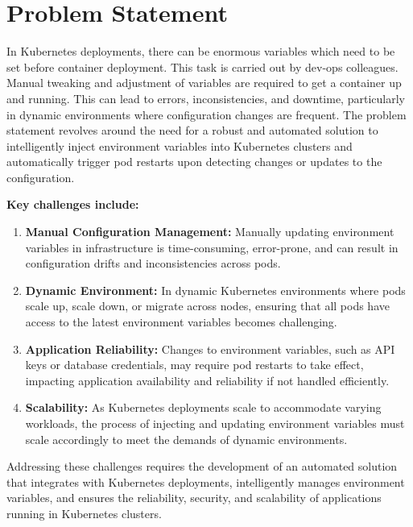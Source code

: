 \section{Problem Statement}

In Kubernetes deployments, there can be enormous variables which need to be set before container deployment. This task is carried out by dev-ops colleagues. Manual tweaking and adjustment of variables are required to get a container up and running. 
This can lead to errors, inconsistencies, and downtime, particularly in dynamic environments where configuration changes are frequent. The problem statement revolves around the need for a robust and automated solution to intelligently inject environment variables into Kubernetes clusters and automatically trigger pod restarts upon detecting changes or updates to the configuration.

\bigskip

\textbf{Key challenges include:}

\begin{enumerate}
    \item \textbf{Manual Configuration Management:} Manually updating environment variables in infrastructure is time-consuming, error-prone, and can result in configuration drifts and inconsistencies across pods.
    
    \item \textbf{Dynamic Environment:} In dynamic Kubernetes environments where pods scale up, scale down, or migrate across nodes, ensuring that all pods have access to the latest environment variables becomes challenging.
    
    \item \textbf{Application Reliability:} Changes to environment variables, such as API keys or database credentials, may require pod restarts to take effect, impacting application availability and reliability if not handled efficiently.
    
    \item \textbf{Scalability:} As Kubernetes deployments scale to accommodate varying workloads, the process of injecting and updating environment variables must scale accordingly to meet the demands of dynamic environments.
\end{enumerate}

Addressing these challenges requires the development of an automated solution that integrates with Kubernetes deployments, intelligently manages environment variables, and ensures the reliability, security, and scalability of applications running in Kubernetes clusters.
